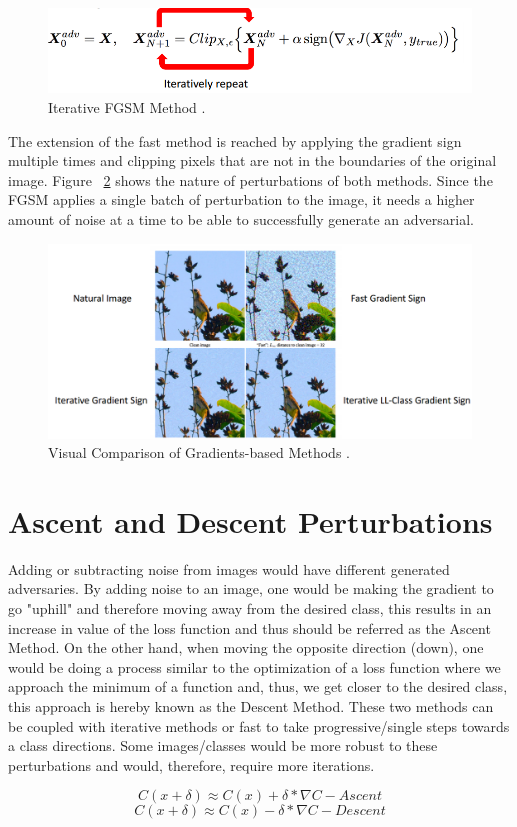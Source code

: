 \begin{figure}[!h]
	\centering
	\includegraphics[scale=0.6]{iter_fgsm.png}
	\caption{Iterative FGSM Method \cite{goodfellow2016}.}
	\label{fig:iter_fgsm_craft}
\end{figure}
The extension of the fast method is reached by applying the gradient sign multiple times and clipping pixels that are not in the boundaries of the original image. Figure ~\ref{fig:iter_single_comp} shows the nature of perturbations of both methods. Since the FGSM applies a single batch of perturbation to the image, it needs a higher amount of noise at a time to be able to successfully generate an adversarial.
\begin{figure}[!h]
	\centering
	\includegraphics[scale=0.4]{iter_single.png}
	\caption{Visual Comparison of Gradients-based Methods \cite{goodfellow2016}.}
	\label{fig:iter_single_comp}
\end{figure}


\section{Ascent and Descent Perturbations}

Adding or subtracting noise from images would have different generated adversaries. By adding noise to an image, one would be making the gradient to go "uphill" and therefore moving away from the desired class, this results in an increase in value of the loss function and thus should be referred as the Ascent Method. On the other hand, when moving the opposite direction (down), one would be doing a process similar to the optimization of a loss function where we approach the minimum of a function and, thus, we get closer to the desired class, this approach is hereby known as the Descent Method. These two methods can be coupled with iterative methods or fast to take progressive/single steps towards a class directions. Some images/classes would be more robust to these perturbations and would, therefore, require more iterations.

$$ C(x + \delta)\approx C(x) + \delta * \nabla C - Ascent$$
$$ C(x + \delta)\approx C(x) - \delta * \nabla C - Descent$$